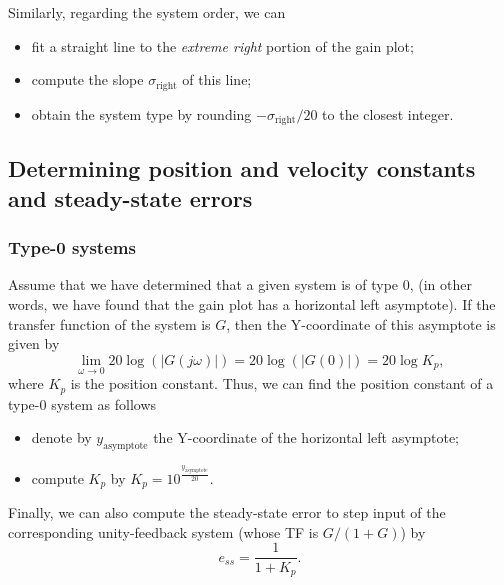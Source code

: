 \documentclass[a4paper,11pt]{report}
\theoremstyle{definition}
\begin{document}
Similarly, regarding the system order, we can
\begin{itemize}
\item fit a straight line to the \emph{extreme right} portion of the
  gain plot;
\item compute the slope $\sigma_\mathrm{right}$ of this line;
\item obtain the system type by rounding $-\sigma_\mathrm{right}/20$
  to the closest integer.
\end{itemize}

\subsection{Determining position and velocity constants and steady-state
  errors}
\label{sec:errors}

\subsubsection{Type-0 systems}

Assume that we have determined that a given system is of type 0, (in
other words, we have found that the gain plot has a horizontal left
asymptote). If the transfer function of the system is $G$, then the
Y-coordinate of this asymptote is given by
\[
\lim_{\omega\to 0} 20\log(|G(j\omega)|) = 20\log(|G(0)|) = 20\log K_p,
\]
where $K_p$ is the position constant. Thus, we can find the position
constant of a type-0 system as follows
\begin{itemize}
\item denote by $y_\mathrm{asymptote}$ the Y-coordinate of the horizontal
  left asymptote;
\item compute $K_p$ by $K_p = 10^{\frac{y_\mathrm{asymptote}}{20}}$.
\end{itemize}

Finally, we can also compute the steady-state error to step input of
the corresponding unity-feedback system (whose TF is $G/(1+G)$) by
\[
e_{ss} = \frac{1}{1+K_p}.
\]
\end{document}

